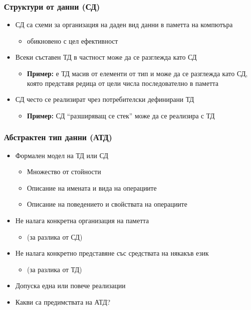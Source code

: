 \documentclass{beamer}
\begin{document}
\begin{frame}
  \frametitle{Структури от данни (СД)}

  \begin{itemize}[<+->]
  \item СД са схеми за организация на даден вид данни в паметта на компютъра
    \begin{itemize}
    \item обикновено с цел ефективност
    \end{itemize}
  \item Всеки съставен ТД в частност може да се разглежда като СД
    \begin{itemize}
    \item \textbf{Пример:}  е ТД масив от елементи от тип  и може да се разглежда като СД, която представя редица от цели числа последователно в паметта
    \end{itemize}
  \item СД често се реализират чрез потребителски дефинирани ТД
    \begin{itemize}
    \item \textbf{Пример:} СД ``разширяващ се стек'' може да се реализира с ТД 
    \end{itemize}
  \end{itemize}
\end{frame}

\begin{frame}
  \frametitle{Абстрактен тип данни (АТД)}

  \begin{itemize}[<+->]
  \item Формален модел на ТД или СД
    \begin{itemize}[<.->]
    \item Множество от стойности
    \item Описание на имената и вида на операциите
    \item Описание на поведението и свойствата на операциите
    \end{itemize}
  \item Не налага конкретна организация на паметта
    \begin{itemize}[<.->]
    \item (за разлика от СД)
    \end{itemize}
  \item Не налага конкретно представяне със средствата на някакъв език
    \begin{itemize}[<.->]
    \item (за разлика от ТД)
    \end{itemize}
  \item Допуска една или повече реализации
  \item \alert{Какви са предимствата на АТД?}
  \end{itemize}
\end{frame}
\end{document}
